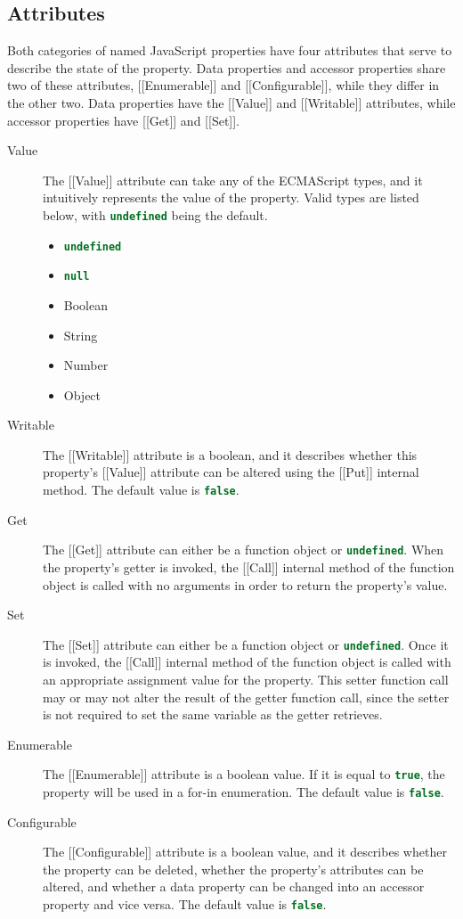 \documentclass[a4paper,11pt,twoside]{report}
\def\jsinline{\lstinline[language=JavaScript, basicstyle=\small]}%\end{lstlisting}
\begin{document}
\subsection{Attributes}\label{sec:attributes}
Both categories of named JavaScript properties have four attributes that serve to describe the state of the property. Data properties and accessor properties share two of these attributes, [[Enumerable]] and [[Configurable]], while they differ in the other two. Data properties have the [[Value]] and [[Writable]] attributes, while accessor properties have [[Get]] and [[Set]].

\begin{description}
\item[Value] The [[Value]] attribute can take any of the ECMAScript types, and it intuitively represents the value of the property. Valid types are listed below, with \jsinline|undefined| being the default.
\begin{multicols}{2}
\begin{itemize}
	\item \jsinline|undefined|
	\item \jsinline|null|
	\item Boolean
	\item String
	\item Number
	\item Object
\end{itemize}
\end{multicols}

\item[Writable] The [[Writable]] attribute is a boolean, and it describes whether this property's [[Value]] attribute can be altered using the [[Put]] internal method. The default value is \jsinline|false|. 

\item[Get] The [[Get]] attribute can either be a function object or \jsinline|undefined|. When the property's getter is invoked, the [[Call]] internal method of the function object is called with no arguments in order to return the property's value.

\item[Set] The [[Set]] attribute can either be a function object or \jsinline|undefined|. Once it is invoked, the [[Call]] internal method of the function object is called with an appropriate assignment value for the property. This setter function call may or may not alter the result of the getter function call, since the setter is not required to set the same variable as the getter retrieves. 

\item[Enumerable] The [[Enumerable]] attribute is a boolean value. If it is equal to \jsinline|true|, the property will be used in a for-in enumeration. The default value is \jsinline|false|.

\item[Configurable] The [[Configurable]] attribute is a boolean value, and it describes whether the property can be deleted, whether the property's attributes can be altered, and whether a data property can be changed into an accessor property and vice versa. The default value is \jsinline|false|.
\end{description}
\end{document}
